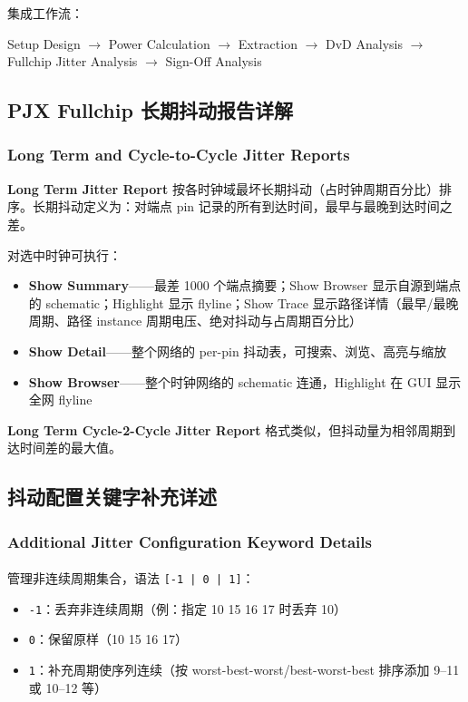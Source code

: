 集成工作流：
\begin{center}
Setup Design $\rightarrow$ Power Calculation $\rightarrow$ Extraction $\rightarrow$ DvD Analysis $\rightarrow$ Fullchip Jitter Analysis $\rightarrow$ Sign-Off Analysis
\end{center}

\subsection{PJX Fullchip 长期抖动报告详解}
\subsubsection*{Long Term and Cycle-to-Cycle Jitter Reports}

\textbf{Long Term Jitter Report} 按各时钟域最坏长期抖动（占时钟周期百分比）排序。长期抖动定义为：对端点 pin 记录的所有到达时间，最早与最晚到达时间之差。

对选中时钟可执行：
\begin{itemize}
  \item \textbf{Show Summary}——最差 1000 个端点摘要；Show Browser 显示自源到端点的 schematic；Highlight 显示 flyline；Show Trace 显示路径详情（最早/最晚周期、路径 instance 周期电压、绝对抖动与占周期百分比）
  \item \textbf{Show Detail}——整个网络的 per-pin 抖动表，可搜索、浏览、高亮与缩放
  \item \textbf{Show Browser}——整个时钟网络的 schematic 连通，Highlight 在 GUI 显示全网 flyline
\end{itemize}

\textbf{Long Term Cycle-2-Cycle Jitter Report} 格式类似，但抖动量为相邻周期到达时间差的最大值。

\subsection{抖动配置关键字补充详述}
\subsubsection*{Additional Jitter Configuration Keyword Details}

\paragraph{}
管理非连续周期集合，语法 \texttt{[-1 | 0 | 1]}：
\begin{itemize}
  \item \texttt{-1}：丢弃非连续周期（例：指定 10 15 16 17 时丢弃 10）
  \item \texttt{0}：保留原样（10 15 16 17）
  \item \texttt{1}：补充周期使序列连续（按 worst-best-worst/best-worst-best 排序添加 9--11 或 10--12 等）
\end{itemize}

